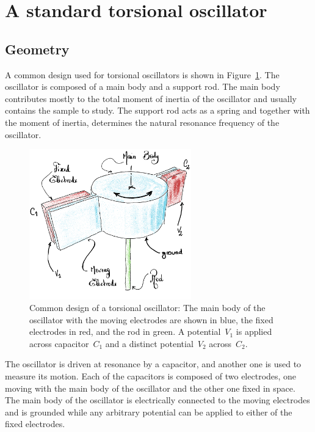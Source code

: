 



\section{A standard torsional oscillator}

\subsection{Geometry}
\label{sec.standard}
A common design used for torsional oscillators is shown in Figure~\ref{fig.StandardDesign}.
The oscillator is composed of a main body and a support rod. The main body contributes mostly to the total moment of inertia of the oscillator and usually contains the sample to study. The support rod acts as a spring and together with the moment of inertia, determines the natural resonance frequency of the oscillator.
\begin{figure}[htb]
	\captionsetup{width=.8\linewidth}
	\centering
	\includegraphics[width=7cm]{StdDesign1}
	\caption{ \small Common design of a torsional oscillator:
		The main body of the oscillator with the moving electrodes are shown in blue, the fixed electrodes in red, and the rod in green. A potential~$V_1$ is applied across capacitor~$C_1$ and a distinct potential~$V_2$ across~$C_2$.}
	\label{fig.StandardDesign}
\end{figure}
The oscillator is driven at resonance by a capacitor, and another one is used to measure its motion. Each of the capacitors is composed of two electrodes, one moving with the main body of the oscillator and the other one fixed in space. The main body of the oscillator is electrically connected to the moving electrodes and is grounded while any arbitrary potential can be applied to either of the fixed electrodes.


